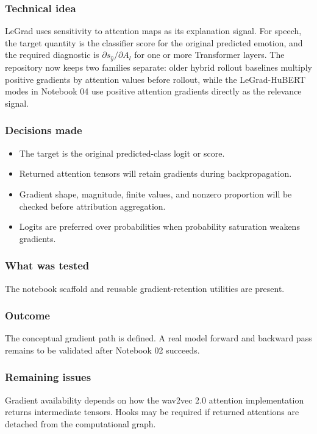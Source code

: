 \documentclass[11pt]{article}
\begin{document}
\subsubsection*{Technical idea}
LeGrad uses sensitivity to attention maps as its explanation signal. For speech, the target quantity is the classifier score for the original predicted emotion, and the required diagnostic is $\partial s_{\hat{y}}/\partial A_l$ for one or more Transformer layers. The repository now keeps two families separate: older hybrid rollout baselines multiply positive gradients by attention values before rollout, while the LeGrad-HuBERT modes in Notebook 04 use positive attention gradients directly as the relevance signal.

\subsubsection*{Decisions made}
\begin{itemize}
  \item The target is the original predicted-class logit or score.
  \item Returned attention tensors will retain gradients during backpropagation.
  \item Gradient shape, magnitude, finite values, and nonzero proportion will be checked before attribution aggregation.
  \item Logits are preferred over probabilities when probability saturation weakens gradients.
\end{itemize}

\subsubsection*{What was tested}
The notebook scaffold and reusable gradient-retention utilities are present.

\subsubsection*{Outcome}
The conceptual gradient path is defined. A real model forward and backward pass remains to be validated after Notebook 02 succeeds.

\subsubsection*{Remaining issues}
Gradient availability depends on how the wav2vec 2.0 attention implementation returns intermediate tensors. Hooks may be required if returned attentions are detached from the computational graph.
\end{document}
